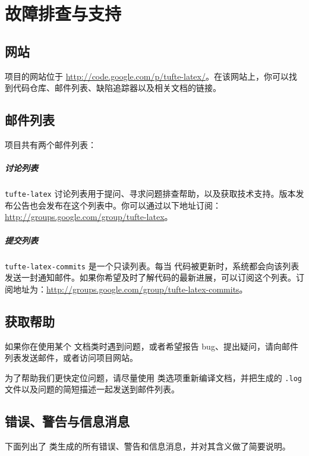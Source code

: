 


\chapter{故障排查与支持}
\label{ch:troubleshooting}

\section{\TL 网站}\label{sec:website}
\TL 项目的网站位于
\url{http://code.google.com/p/tufte-latex/}。在该网站上，你可以找到代码仓库、邮件列表、缺陷追踪器以及相关文档的链接。

\section{\TL 邮件列表}\label{sec:mailing-lists}
\TL 项目共有两个邮件列表：

\paragraph{讨论列表}
\texttt{tufte-latex} 讨论列表用于提问、寻求问题排查帮助，以及获取技术支持。版本发布公告也会发布在这个列表中。你可以通过以下地址订阅：\url{http://groups.google.com/group/tufte-latex}。

\paragraph{提交列表}
\texttt{tufte-latex-commits} 是一个只读列表。每当 \TL 代码被更新时，系统都会向该列表发送一封通知邮件。如果你希望及时了解代码的最新进展，可以订阅这个列表。订阅地址为：\url{http://groups.google.com/group/tufte-latex-commits}。

\section{获取帮助}\label{sec:getting-help}
如果你在使用某个 \TL 文档类时遇到问题，或者希望报告 bug、提出疑问，请向邮件列表发送邮件，或者访问项目网站。

为了帮助我们更快定位问题，请尽量使用  类选项重新编译文档，并把生成的 \texttt{.log} 文件以及问题的简短描述一起发送到邮件列表。



\section{错误、警告与信息消息}\label{sec:tl-messages}
下面列出了 \TL 类生成的所有错误、警告和信息消息，并对其含义做了简要说明。

